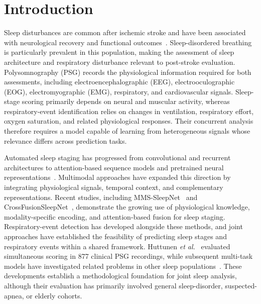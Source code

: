 \documentclass[a4paper,fleqn]{cas-sc}
\begin{document}
\section{Introduction}

Sleep disturbances are common after ischemic stroke and have been associated with neurological recovery and functional outcomes~\cite{bassetti2006sleep,denis2024sleep,tellenbach2023brainstem,johnson2010frequency}. Sleep-disordered breathing is particularly prevalent in this population, making the assessment of sleep architecture and respiratory disturbance relevant to post-stroke evaluation. Polysomnography (PSG) records the physiological information required for both assessments, including electroencephalographic (EEG), electrooculographic (EOG), electromyographic (EMG), respiratory, and cardiovascular signals. Sleep-stage scoring primarily depends on neural and muscular activity, whereas respiratory-event identification relies on changes in ventilation, respiratory effort, oxygen saturation, and related physiological responses. Their concurrent analysis therefore requires a model capable of learning from heterogeneous signals whose relevance differs across prediction tasks.

Automated sleep staging has progressed from convolutional and recurrent architectures to attention-based sequence models and pretrained neural representations~\cite{supratak2017deepsleepnet,phan2019seqsleepnet,eldele2021attnsleep,supratak2020tinysleepnet,labram2024,cbramod2025,eegpt2024,biot2023}. Multimodal approaches have expanded this direction by integrating physiological signals, temporal context, and complementary representations. Recent studies, including MMS-SleepNet~\cite{mmssleepnet2025} and CrossFusionSleepNet~\cite{crossfusionsleepnet2026}, demonstrate the growing use of physiological knowledge, modality-specific encoding, and attention-based fusion for sleep staging. Respiratory-event detection has developed alongside these methods, and joint approaches have established the feasibility of predicting sleep stages and respiratory events within a shared framework. Huttunen \emph{et al.}~\cite{huttunen2023simultaneous} evaluated simultaneous scoring in 877 clinical PSG recordings, while subsequent multi-task models have investigated related problems in other sleep populations~\cite{multitask2025elderly}. These developments establish a methodological foundation for joint sleep analysis, although their evaluation has primarily involved general sleep-disorder, suspected-apnea, or elderly cohorts.
\end{document}
